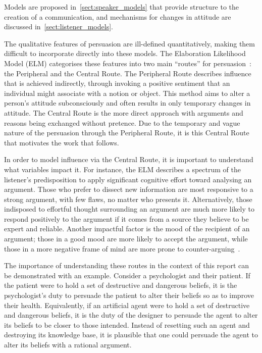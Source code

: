 Models are proposed in~\cref{sect:speaker_models} that provide structure to the creation of a communication, and mechanisms for changes in attitude are discussed in~\cref{sect:listener_models}. 

The qualitative features of persuasion are ill-defined quantitatively, making them difficult to incorporate directly into these models. The Elaboration Likelihood Model (ELM) categorises these features into two main ``routes'' for persuasion~\cite{Petty1997ThePsychology}: the Peripheral and the Central Route. The Peripheral Route describes influence that is achieved indirectly, through invoking a positive sentiment that an individual might associate with a notion or object. This method aims to alter a person's attitude subconsciously and often results in only temporary changes in attitude. The Central Route is the more direct approach with arguments and reasons being exchanged without pretence. Due to the temporary and vague nature of the persuasion through the Peripheral Route, it is this Central Route that motivates the work that follows. 

In order to model influence via the Central Route, it is important to understand what variables impact it. For instance, the ELM describes a spectrum of the listener's predisposition to apply significant cognitive effort toward analysing an argument. Those who prefer to dissect new information are most responsive to a strong argument, with few flaws, no matter who presents it. Alternatively, those indisposed to effortful thought surrounding an argument are much more likely to respond positively to the argument if it comes from a source they believe to be expert and reliable. Another impactful factor is the mood of the recipient of an argument; those in a good mood are more likely to accept the argument, while those in a more negative frame of mind are more prone to counter-arguing~\cite{Petty1997ThePsychology}. 

The importance of understanding these routes in the context of this report can be demonstrated with an example. Consider a psychologist and their patient. If the patient were to hold a set of destructive and dangerous beliefs, it is the psychologist's duty to persuade the patient to alter their beliefs so as to improve their health. Equivalently, if an artificial agent were to hold a set of destructive and dangerous beliefs, it is the duty of the designer to persuade the agent to alter its beliefs to be closer to those intended.  Instead of resetting such an agent and destroying its knowledge base, it is plausible that one could persuade the agent to alter its beliefs with a rational argument. 

